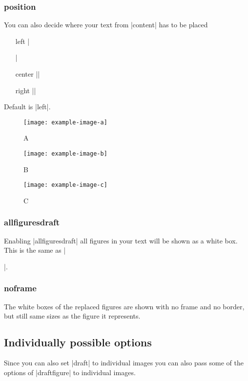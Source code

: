 \documentclass[a4paper,
10pt,
english
]{ltxdoc}
\newcommand\dfstring{|draftfigure|\xspace}
\begin{document}
\subsubsection{position}
You can also decide where your text from |content| has to be placed
\begin{multicols}{3}
\begin{itemize}
	\item[left] |\raggedright|
	\item[center] |\centering|
	\item[right] |\raggedleft|
\end{itemize}
\end{multicols}
Default is |left|.
\begin{code}
\usepackage[%
  content={positioning},
  position = {center},%
  ]{draftfigure}
\end{code}
\begin{examplebox}
\begin{figure}[H]
  \centering
  \texttt{[image: example-image-a]}
  \caption{A}
   \texttt{[image: example-image-b]}
   \caption{B}
   \texttt{[image: example-image-c]}
  \caption{C}
\end{figure}
\end{examplebox}

\clearpage
\subsubsection{allfiguresdraft}
Enabling |allfiguresdraft| all figures in your text will be shown as a white box. This is the same as |\usepackage[draft]{graphicx}|.

\subsubsection{noframe}
The white boxes of the replaced figures are shown with no frame and no border, but still same sizes as the figure it represents.


\subsection{Individually possible options}

Since you can also set |draft| to individual images you can also pass some of the options of \dfstring to individual images.
\end{document}
